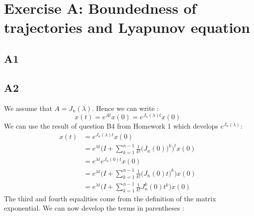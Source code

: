 \documentclass[11pt]{article}
\begin{document}
\section*{Exercise A: Boundedness of trajectories and Lyapunov equation}
\subsection*{A1}
\subsection*{A2}
We assume that $A=J_n(\lambda)$. Hence we can write :
\begin{equation*}
    x(t)=e^{At}x(0)=e^{J_n(\lambda)t}x(0)
\end{equation*}
We can use the result of question B4 from Homework 1 which develops $e^{J_n(\lambda)}$:
\begin{align*}
    x(t)&=e^{J_n(\lambda)t}x(0)\\
    &=e^{\lambda t}\Bigg(I+\sum_{k=1}^{n-1}\frac{1}{k!}\big(J_n(0)\big)^k\Bigg)^t x(0)\\
    &=e^{\lambda t}e^{J_n(0) t} x(0)\\
    &=e^{\lambda t}\Bigg(I+\sum_{k=1}^{n-1}\frac{1}{k!}\big(J_n(0) t\big)^k\Bigg) x(0)\\
    &=e^{\lambda t}\Bigg(I+\sum_{k=1}^{n-1}\frac{1}{k!}J_n^k(0) t^k\Bigg) x(0)
\end{align*}
The third and fourth equalities come from the definition of the matrix exponential. We can now develop the terms in parentheses : 
\end{document}
